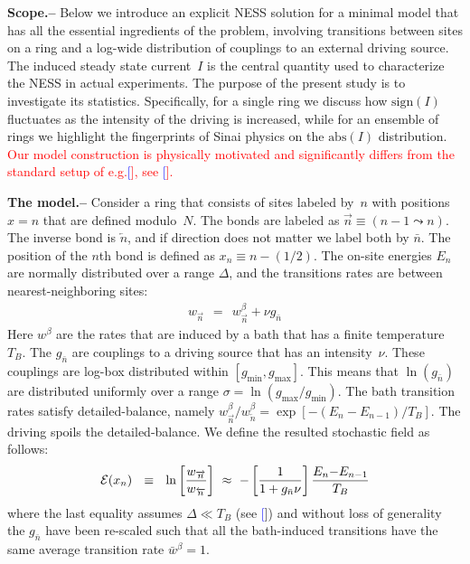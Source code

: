 \documentclass[aps,prl,floats,floatfix,twocolumn]{revtex4}
\newcommand{\mylabel}[1]{\label{#1}}
\newcommand{\beq}{\begin{eqnarray}}
\newcommand{\eeq}{\end{eqnarray}}
\newcommand{\be}[1]{\begin{eqnarray}\ifthenelse{#1=-1}
{\nonumber}{\ifthenelse{#1=0}{}{\mylabel{e#1}}}}
\newcommand{\ee}{\end{eqnarray}}
\newcommand{\sect}[1]{{\bf #1.-- }}
\newcommand{\rmrk}[1]{\textcolor{red}{#1}}
\renewcommand{\cite}[1]{\textcolor{blue}{[\onlinecite{#1}}]} %
\begin{document}
\sect{Scope}
%
Below we introduce an explicit NESS solution for a minimal model that 
has all the essential ingredients of the problem, involving transitions between sites on a ring 
and a log-wide distribution of couplings to an external driving source. 
The induced steady state current~$I$ is the central quantity used to characterize 
the NESS in actual experiments. The purpose of the present study is to investigate 
its statistics. Specifically, for a single ring we discuss how $\text{sign}(I)$ fluctuates    
as the intensity of the driving is increased, while for an ensemble 
of rings we highlight the fingerprints of Sinai physics on the $\text{abs}(I)$ distribution.  
%
\rmrk{Our model construction is physically motivated and significantly differs 
from the standard setup of e.g.\cite{sinai2}, see \cite{rm}.}


\sect{The model}
%
%
Consider a ring that consists of sites labeled by~$n$ 
with positions ${x=n}$ that are defined modulo~$N$. 
The bonds are labeled as ${\overrightarrow{n}\equiv(n{-}1 \leadsto n)}$.
The inverse bond is $\overleftarrow{n}$, and if direction does 
not matter we label both by $\bar{n}$. The position of the $n$th bond 
is defined as $x_n \equiv n{-}(1/2)$. The on-site energies $E_n$ 
are normally distributed over a range $\Delta$,  
and the transitions rates are between nearest-neighboring sites:   
%
\beq
w_{\overrightarrow{n}} \ \ = \ \ w^{\beta}_{\overrightarrow{n}} + \nu g_{\bar{n}}
\eeq 
%
Here $w^{\beta}$ are the rates that are induced by a bath that has 
a finite temperature $T_B$. The $g_{\bar{n}}$ are 
couplings to a driving source that has an intensity~$\nu$. 
These couplings are log-box distributed within ${[g_{\text{min}},g_{\text{max}}]}$.
This means that $\ln(g_{\bar{n}})$ are distributed uniformly 
over a range ${\sigma=\ln(g_{\text{max}}/g_{\text{min}})}$. 
%
%
%
%
The bath transition rates satisfy detailed-balance, 
namely $w^{\beta}_{\overrightarrow{n}}/w^{\beta}_{\overleftarrow{n}} = \exp[-(E_{n}{-}E_{n{-}1})/T_B]$.
The driving spoils the detailed-balance. We define the resulted 
stochastic field as follows:
%
\be{100}
\mathcal{E}(x_n) \ \ \equiv \ \ \ln \left[\frac{w_{\overrightarrow{n}}}{w_{\overleftarrow{n}}}\right] 
\ \approx \ - \left[ \frac{1}{1+g_{\bar{n}}\nu} \right] \frac{E_n{-}E_{n{-}1}}{T_B}
\ee
%
where the last equality assumes ${\Delta \ll T_B}$ (see \cite{SM})
and without loss of generality the $g_{\bar{n}}$ have been re-scaled 
such that all the bath-induced transitions have 
the same average transition rate ${\bar{w}^{\beta}=1}$. 
\end{document}
